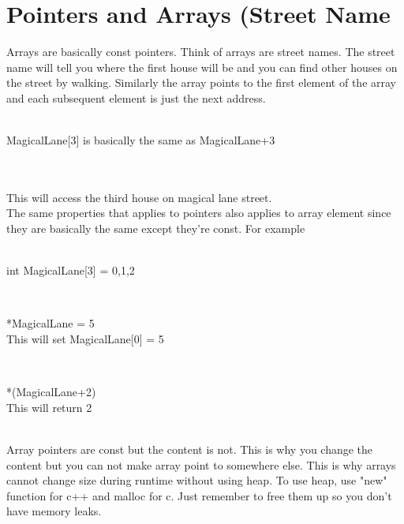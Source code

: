 \documentclass[a4paper]{article}
\begin{document}
\section{Pointers and Arrays (Street Name}
Arrays are basically const pointers. Think of arrays are street names. The street name will tell you where the first house will be and you can find other houses on the street by walking. Similarly the array points to the first element of the array and each subsequent element is just the next address. \\
\\
\centerline{MagicalLane[3] is basically the same as MagicalLane+3} \\
\\
This will access the third house on magical lane street. 
\\

The same properties that applies to pointers also applies to array element since they are basically the same except they're const. For example\\
\\
\centerline{int MagicalLane[3] = {0,1,2}}\\
\centerline{*MagicalLane = 5\\ This will set MagicalLane[0] = 5}\\
\centerline{*(MagicalLane+2) \\ This will return 2}\\

Array pointers are const but the content is not. This is why you change the content but you can not make array point to somewhere else. This is why arrays cannot change size during runtime without using heap. To use heap, use "new" function for c++ and malloc for c. Just remember to free them up so you don't have memory leaks.   
\end{document}
